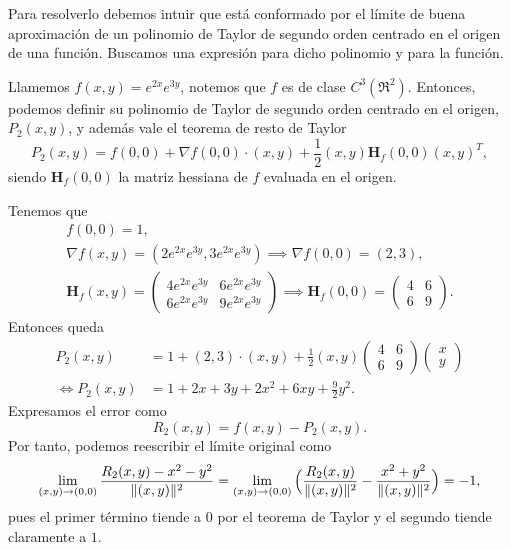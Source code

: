 
\begin{solution}
    Para resolverlo debemos intuir que está conformado por el límite de buena aproximación de un polinomio de Taylor de segundo orden centrado en el origen de una función. Buscamos una expresión para dicho polinomio y para la función.
    
  Llamemos $f(x,y) = e^{2x}e^{3y}$, notemos que $f$ es de clase $C^3(\Re^{2}).$  Entonces, podemos definir su polinomio de Taylor de segundo orden centrado en el origen, $ P_2(x,y)$, y adem\'as vale el teorema de resto de Taylor 
    \[
        P_2(x,y) = f(0,0) + \nabla f(0,0)\cdot(x,y) + \frac{1}{2}(x,y)\boldsymbol{H}_f(0,0)(x,y)^T,
    \]
    siendo $\boldsymbol{H}_f(0,0)$ la matriz hessiana de $f$ evaluada en el origen.
    
    Tenemos que
    \begin{gather*}
        f(0,0) = 1,\\[.2cm]
        \nabla f(x,y) = \left(2e^{2x}e^{3y}, 3e^{2x}e^{3y}\right) \implies \nabla f(0,0) = (2,3),\\[.25cm]
        \boldsymbol{H}_f(x,y) = \left(\begin{array}{cc}
            4e^{2x}e^{3y} & 6e^{2x}e^{3y} \\[10pt]
            6e^{2x}e^{3y} & 9e^{2x}e^{3y}
        \end{array}\right) \implies \boldsymbol{H}_f(0,0) = \left(\begin{array}{cc}
            4 & 6 \\
            6 & 9
        \end{array}\right).
    \end{gather*}
    Entonces queda
    \[
    \begin{aligned}
        P_2(x,y) &= 1+(2,3)\cdot(x,y)+\frac{1}{2}(x,y)\left(\begin{array}{cc}
            4 & 6 \\
            6 & 9
        \end{array}\right)
        \left(\begin{array}{cc}
             x\\
             y 
        \end{array}\right) \\[4pt]
        \iff P_2(x,y) &= 1 + 2x + 3y + 2x^2 + 6xy + \frac{9}{2}y^2.
    \end{aligned}
    \]
    Expresamos el error como
    \[
        R_2(x,y) = f(x,y) - P_2(x,y).
    \]
    Por tanto, podemos reescribir el límite original como
    \[\\[2pt]
        \lim_{(x,y) \to (0,0)} \frac{R_2(x,y) - x^2 - y^2}{\|(x,y)\|^2} = 
        \lim_{(x,y) \to (0,0)} \Big( \frac{R_2(x,y)}{\|(x,y)\|^2} - \frac{x^2+y^2}{\|(x,y)\|^2} \Big) = -1,
    \]
pues el primer término tiende a 0 por el teorema de Taylor  y el segundo  tiende claramente a $1.$  
\end{solution}

